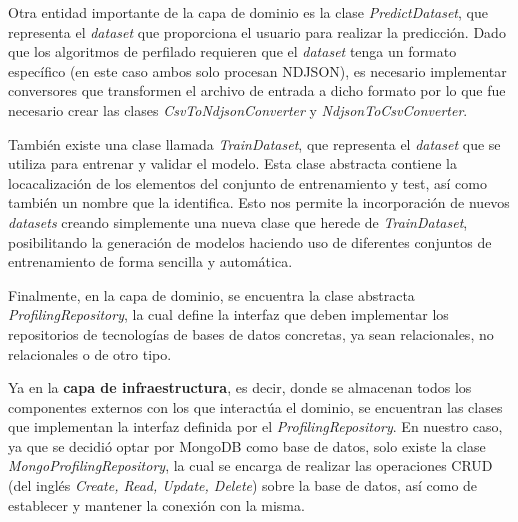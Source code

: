 \bigskip
Otra entidad importante de la capa de dominio es la clase \textit{PredictDataset}, que representa el \textit{dataset} que proporciona el usuario
para realizar la predicción. Dado que los algoritmos de perfilado requieren que el \textit{dataset} tenga un formato específico (en este caso
ambos solo procesan NDJSON), es necesario implementar conversores que transformen el archivo de entrada a dicho formato por lo que
fue necesario crear las clases \textit{CsvToNdjsonConverter} y \textit{NdjsonToCsvConverter}.

\bigskip
También existe una clase llamada \textit{TrainDataset}, que representa
el \textit{dataset} que se utiliza para entrenar y validar el modelo. Esta clase abstracta contiene la locacalización de los elementos
del conjunto de entrenamiento y test, así como también un nombre que la identifica. Esto nos permite la incorporación de nuevos \textit{datasets} creando simplemente
una nueva clase que herede de \textit{TrainDataset}, posibilitando la generación de modelos haciendo uso de diferentes conjuntos de entrenamiento de forma sencilla y automática. 

\bigskip
Finalmente, en la capa de dominio, se encuentra la clase abstracta \textit{ProfilingRepository}, la cual define la interfaz que deben implementar
los repositorios de tecnologías de bases de datos concretas, ya sean relacionales, no relacionales o de otro tipo.

\bigskip
Ya en la \textbf{capa de infraestructura}, es decir, donde se almacenan todos los componentes externos con los que interactúa el dominio, se encuentran las clases que implementan
la interfaz definida por el \textit{ProfilingRepository}. En nuestro caso, ya que se decidió optar por MongoDB como base de datos, solo existe
la clase \textit{MongoProfilingRepository}, la cual se encarga de realizar las operaciones CRUD (del inglés \textit{Create, Read, Update, Delete}) sobre la base de datos, así
como de establecer y mantener la conexión con la misma.


